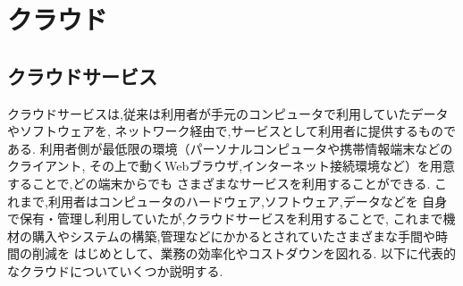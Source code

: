\section{クラウド}
\subsection{クラウドサービス}
クラウドサービスは,従来は利用者が手元のコンピュータで利用していたデータやソフトウェアを,
ネットワーク経由で,サービスとして利用者に提供するものである.
利用者側が最低限の環境（パーソナルコンピュータや携帯情報端末などのクライアント,
その上で動くWebブラウザ,インターネット接続環境など）を用意することで,どの端末からでも
さまざまなサービスを利用することができる.
これまで,利用者はコンピュータのハードウェア,ソフトウェア,データなどを
自身で保有・管理し利用していたが,クラウドサービスを利用することで,
これまで機材の購入やシステムの構築,管理などにかかるとされていたさまざまな手間や時間の削減を
はじめとして、業務の効率化やコストダウンを図れる.
以下に代表的なクラウドについていくつか説明する.

\renewcommand{\labelenumi}{(\arabic{enumi})}

